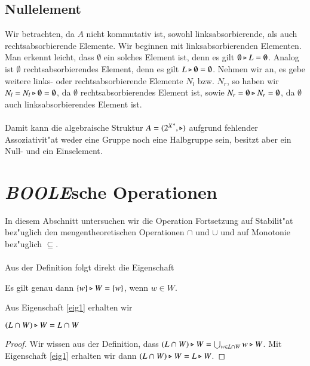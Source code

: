 \subsection{Nullelement}
Wir betrachten, da $A$ nicht kommutativ ist, sowohl linksabsorbierende, als auch rechtsabsorbierende Elemente.
Wir beginnen mit linksabsorbierenden Elementen.
Man erkennt leicht, dass $\emptyset$ ein solches Element ist, denn es gilt $\emptyset\triangleright L = \emptyset$.
Analog ist $\emptyset$ rechtsabsorbierendes Element, denn es gilt $L\triangleright\emptyset =\emptyset$.
Nehmen wir an, es gebe weitere links- oder rechtsabsorbierende Elemente $N_l$ bzw. $N_r$, so haben wir $N_l = N_l\triangleright \emptyset = \emptyset$, da $\emptyset$ rechtsabsorbierendes Element ist, sowie $N_r = \emptyset\triangleright N_r = \emptyset$, da $\emptyset$ auch linksabsorbierendes Element ist.\\\\
Damit kann die algebraische Struktur $A=({2^X}^*,\triangleright)$ aufgrund fehlender Assoziativit"at weder eine Gruppe noch eine Halbgruppe sein, besitzt aber ein Null- und ein Einselement.

\section{\emph{BOOLE}sche Operationen}
In diesem Abschnitt untersuchen wir die Operation Fortsetzung auf Stabilit"at bez"uglich den mengentheoretischen Operationen $\cap$ und $\cup$ und auf Monotonie bez"uglich $\subseteq$.
\\\\Aus der Definition folgt direkt die Eigenschaft

\vspace{2ex}

\begin{eigen}\label{eig1}
Es gilt genau dann $\{w\} \triangleright W = \{w\}$, wenn $w\in W$.
\end{eigen}

Aus Eigenschaft \ref{eig1} erhalten wir

\vspace{2ex}

\begin{eigen}
$(L\cap W) \triangleright W = L\cap W$
\end{eigen}
\begin{proof}
Wir wissen aus der Definition, dass $(L\cap W)\triangleright W = \bigcup_{w\in L\cap W} w\triangleright W$. Mit Eigenschaft \ref{eig1} erhalten wir dann $(L\cap W)\triangleright W = L\triangleright W$.
\end{proof}

